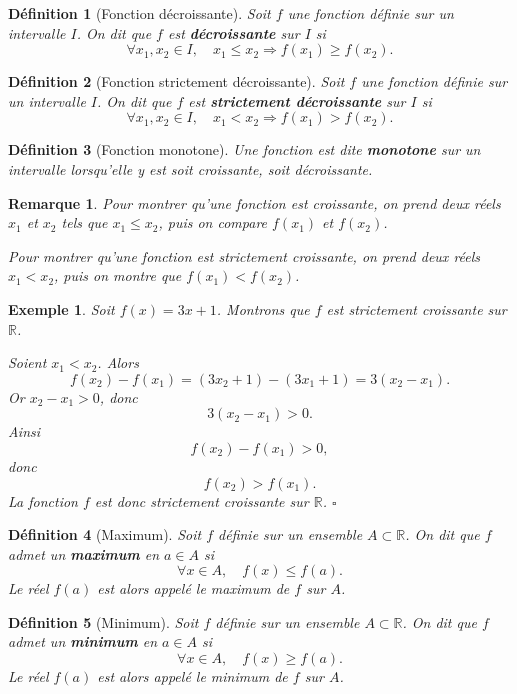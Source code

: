 \documentclass[11pt,a4paper]{article}
\newtheorem{definition}{Définition}[section]
\newtheorem*{exemple}{Exemple}
\newtheorem*{remarque}{Remarque}
\newcommand{\R}{\mathbb{R}}
\begin{document}
\begin{definition}[Fonction décroissante]
Soit \(f\) une fonction définie sur un intervalle \(I\).  
On dit que \(f\) est \textbf{décroissante} sur \(I\) si
\[
\forall x_1,x_2\in I,\quad x_1\le x_2 \Rightarrow f(x_1)\ge f(x_2).
\]
\end{definition}

\begin{definition}[Fonction strictement décroissante]
Soit \(f\) une fonction définie sur un intervalle \(I\).  
On dit que \(f\) est \textbf{strictement décroissante} sur \(I\) si
\[
\forall x_1,x_2\in I,\quad x_1<x_2 \Rightarrow f(x_1)>f(x_2).
\]
\end{definition}

\begin{definition}[Fonction monotone]
Une fonction est dite \textbf{monotone} sur un intervalle lorsqu'elle y est soit croissante, soit décroissante.
\end{definition}

\begin{remarque}
Pour montrer qu'une fonction est croissante, on prend deux réels \(x_1\) et \(x_2\) tels que \(x_1\le x_2\), puis on compare \(f(x_1)\) et \(f(x_2)\).

Pour montrer qu'une fonction est strictement croissante, on prend deux réels \(x_1<x_2\), puis on montre que \(f(x_1)<f(x_2)\).
\end{remarque}

\begin{exemple}
Soit \(f(x)=3x+1\).  
Montrons que \(f\) est strictement croissante sur \(\R\).

Soient \(x_1<x_2\). Alors
\[
f(x_2)-f(x_1)=(3x_2+1)-(3x_1+1)=3(x_2-x_1).
\]
Or \(x_2-x_1>0\), donc
\[
3(x_2-x_1)>0.
\]
Ainsi
\[
f(x_2)-f(x_1)>0,
\]
donc
\[
f(x_2)>f(x_1).
\]
La fonction \(f\) est donc strictement croissante sur \(\R\). \(\square\)
\end{exemple}

\begin{definition}[Maximum]
Soit \(f\) définie sur un ensemble \(A\subset \R\).  
On dit que \(f\) admet un \textbf{maximum} en \(a\in A\) si
\[
\forall x\in A,\quad f(x)\le f(a).
\]
Le réel \(f(a)\) est alors appelé le maximum de \(f\) sur \(A\).
\end{definition}

\begin{definition}[Minimum]
Soit \(f\) définie sur un ensemble \(A\subset \R\).  
On dit que \(f\) admet un \textbf{minimum} en \(a\in A\) si
\[
\forall x\in A,\quad f(x)\ge f(a).
\]
Le réel \(f(a)\) est alors appelé le minimum de \(f\) sur \(A\).
\end{definition}
\end{document}
